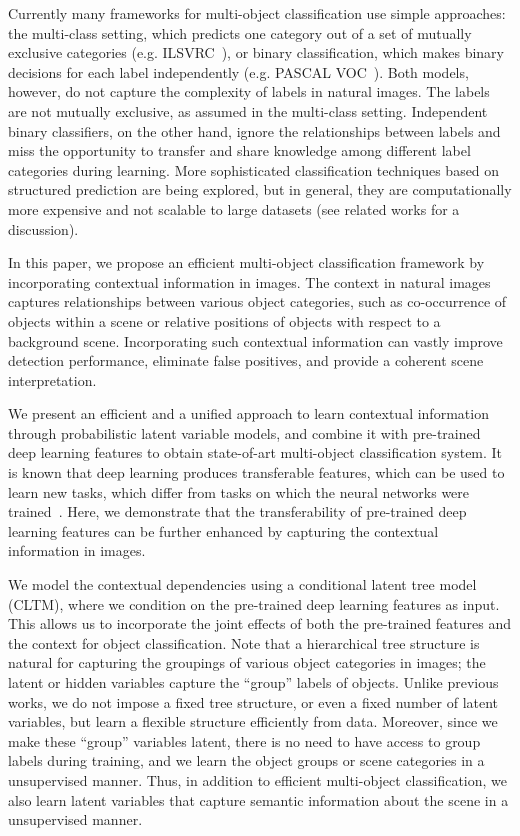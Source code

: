 \documentclass{article}
\begin{document}
Currently many frameworks for multi-object classification use simple approaches:  the multi-class setting, which predicts one category out of a set of mutually exclusive categories (e.g. ILSVRC~\cite{ILSVRC15}), or binary classification, which makes binary decisions for each label independently (e.g. PASCAL VOC~\cite{pascal}). Both models, however, do not capture the complexity of  labels in natural images. The labels are not mutually exclusive, as assumed in the multi-class setting.  Independent binary classifiers, on the other hand, ignore the relationships between labels and miss the   opportunity to transfer and share knowledge among different label categories during learning. More sophisticated classification techniques based on
structured prediction are being explored, but in general, they  are  computationally more expensive and not scalable to large datasets (see related works for a discussion).


In this paper, we propose an efficient multi-object classification framework by   incorporating contextual information in images.  The context in natural images captures relationships between various object categories, such as co-occurrence of objects within a scene or relative positions of objects with respect to a background scene. Incorporating such contextual information   can vastly improve  detection performance, eliminate false positives, and provide a coherent scene interpretation.



We present an efficient and a unified approach to learn contextual information through probabilistic latent variable models, and combine it with pre-trained deep learning features  to obtain state-of-art   multi-object classification system. It is known that deep learning produces transferable features, which can be used to learn new tasks, which differ from tasks on which the neural networks were trained~\cite{transferable,oquab2014learning}. Here,  we demonstrate that    the transferability of pre-trained deep learning features  can be further enhanced by capturing the contextual information in images.



We model the contextual   dependencies using a conditional latent  tree model (CLTM), where we condition on the pre-trained deep learning features as input. This allows us to incorporate the joint effects of both the pre-trained features and the context for object classification.
Note that a hierarchical tree structure is natural for capturing the groupings of various object categories in images; the latent or hidden variables capture the ``group'' labels   of objects. Unlike previous works, we do not impose a fixed tree structure, or even a fixed number of latent variables, but learn a flexible structure efficiently from data. Moreover, since we make these ``group'' variables latent, there is no need to have access to  group labels during  training, and we  learn the object groups or scene categories in a unsupervised manner. Thus, in addition to efficient multi-object classification, we also learn latent variables that capture semantic information about the scene in a unsupervised manner.
\end{document}
